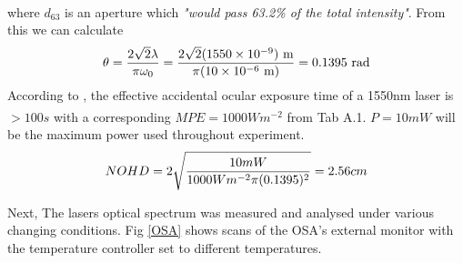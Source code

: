 \documentclass[12pt,a4paper]{report}
\begin{document}
where $d_{63}$ is an aperture which \textit{"would pass 63.2\% of the total intensity"}\textsuperscript{\cite{ucclaser-tables}}. From this we can calculate
\begin{equation}
    \theta=\frac{2\sqrt{2}\lambda}{\pi\omega_{0}}=\frac{2\sqrt{2}(1550\times 10^{-9})\text{ m}}{\pi (10\times10^{-6}\text{ m})}=0.1395 \text{ rad}
    \notag
\end{equation}
According to \cite{ucclaser-tables}, the effective accidental ocular exposure time of a 1550nm laser is $>100s$ with a corresponding $MPE = 1000Wm^{-2}$ from Tab A.1\textsuperscript{\cite{ucclaser-tables}}.
$P = 10mW$ will be the maximum power used throughout experiment.
\begin{equation}
    NOHD=2\sqrt{\frac{10mW}{1000Wm^{-2}\pi(0.1395)^2}}=2.56cm
    \notag
\end{equation}

Next, The lasers optical spectrum was measured and analysed under various changing conditions. Fig \ref{OSA} shows scans of the OSA's external monitor with the temperature controller set to different temperatures.
\end{document}
